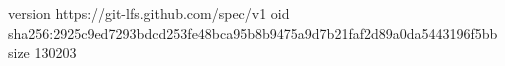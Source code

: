 version https://git-lfs.github.com/spec/v1
oid sha256:2925c9ed7293bdcd253fe48bca95b8b9475a9d7b21faf2d89a0da5443196f5bb
size 130203

